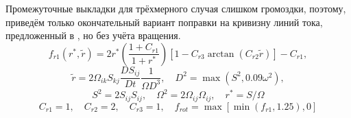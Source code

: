 		Промежуточные выкладки для трёхмерного случая слишком громоздки, поэтому, приведём только окончательный вариант поправки на кривизну линий тока, предложенный в \cite{Smirnov}, но без учёта вращения.
		\begin{equation}
				f_{r1}(r^*,\tilde{r}) = 2r^*\left( \frac{1+C_{r1}}{1+ r^*} \right)\left[ 1-C_{r3}\arctan{(C_{r2}\tilde{r})} \right] - C_{r1},
		\end{equation}
		\begin{equation}
				\tilde{r} = 2\Omega_{ik}S_{kj}\frac{DS_{ij}}{Dt}\frac{1}{\Omega D^3}, \quad D^2 = \max(S^2, 0.09 \omega^2),
		\end{equation}
		$$
				S^2 = 2 S_{ij}S_{ij}, \quad \Omega^2 = 2 \Omega_{ij} \Omega_{ij}, \quad r^* = S/\Omega
		$$
		$$
				C_{r1} = 1, \quad C_{r2} = 2, \quad C_{r3} = 1, \quad f_{rot} = \max[\min(f_{r1},1.25),0]
		$$
